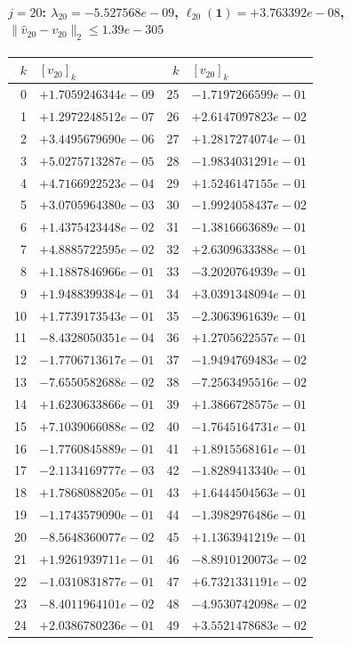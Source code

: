 \paragraph{$j = 20$: $\lambda_{20} = -5.527568e-09$, \quad $\ell_{20}(\mathbf{1}) = +3.763392e-08$, \quad $\|\hat{v}_{20} - v_{20}\|_2 \leq 1.39e-305$}
\begin{center}
{\footnotesize
\begin{tabular}{r@{\;\;}l@{\quad}r@{\;\;}l}
\toprule
$k$ & $[v_{20}]_k$ & $k$ & $[v_{20}]_k$ \\
\midrule
0 & $+1.7059246344e-09$ & 25 & $-1.7197266599e-01$ \\
1 & $+1.2972248512e-07$ & 26 & $+2.6147097823e-02$ \\
2 & $+3.4495679690e-06$ & 27 & $+1.2817274074e-01$ \\
3 & $+5.0275713287e-05$ & 28 & $-1.9834031291e-01$ \\
4 & $+4.7166922523e-04$ & 29 & $+1.5246147155e-01$ \\
5 & $+3.0705964380e-03$ & 30 & $-1.9924058437e-02$ \\
6 & $+1.4375423448e-02$ & 31 & $-1.3816663689e-01$ \\
7 & $+4.8885722595e-02$ & 32 & $+2.6309633388e-01$ \\
8 & $+1.1887846966e-01$ & 33 & $-3.2020764939e-01$ \\
9 & $+1.9488399384e-01$ & 34 & $+3.0391348094e-01$ \\
10 & $+1.7739173543e-01$ & 35 & $-2.3063961639e-01$ \\
11 & $-8.4328050351e-04$ & 36 & $+1.2705622557e-01$ \\
12 & $-1.7706713617e-01$ & 37 & $-1.9494769483e-02$ \\
13 & $-7.6550582688e-02$ & 38 & $-7.2563495516e-02$ \\
14 & $+1.6230633866e-01$ & 39 & $+1.3866728575e-01$ \\
15 & $+7.1039066088e-02$ & 40 & $-1.7645164731e-01$ \\
16 & $-1.7760845889e-01$ & 41 & $+1.8915568161e-01$ \\
17 & $-2.1134169777e-03$ & 42 & $-1.8289413340e-01$ \\
18 & $+1.7868088205e-01$ & 43 & $+1.6444504563e-01$ \\
19 & $-1.1743579090e-01$ & 44 & $-1.3982976486e-01$ \\
20 & $-8.5648360077e-02$ & 45 & $+1.1363941219e-01$ \\
21 & $+1.9261939711e-01$ & 46 & $-8.8910120073e-02$ \\
22 & $-1.0310831877e-01$ & 47 & $+6.7321331191e-02$ \\
23 & $-8.4011964101e-02$ & 48 & $-4.9530742098e-02$ \\
24 & $+2.0386780236e-01$ & 49 & $+3.5521478683e-02$ \\
\bottomrule
\end{tabular}
}
\end{center}


